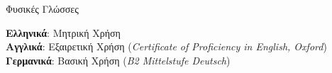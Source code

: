 \documentclass{resume} %
\begin{document}
\begin{rSection}{\textgreek{Φυσικές Γλώσσες}}

  \textgreek{{\bf Ελληνικά}: Μητρική Χρήση}\\
  \textgreek{{\bf Αγγλικά}: Εξαιρετική Χρήση} ({\em Certificate of Proficiency in English, Oxford})\\
  \textgreek{{\bf Γερμανικά}: Βασική Χρήση} ({\em B2 Mittelstufe Deutsch})\\
\end{rSection}



\end{document}
